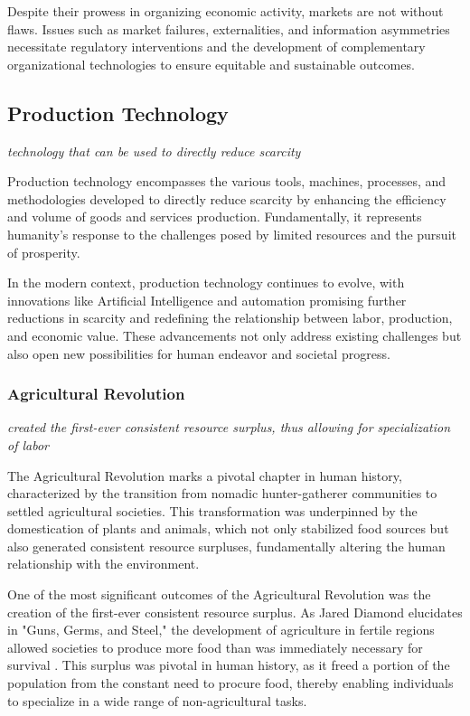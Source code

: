 \documentclass{article}
\begin{document}
Despite their prowess in organizing economic activity, markets are not without flaws. Issues such as market failures, externalities, and information asymmetries necessitate regulatory interventions and the development of complementary organizational technologies to ensure equitable and sustainable outcomes.

\subsection{Production Technology}
\label{sec:ProductionTechnology}
\textit{technology that can be used to directly reduce scarcity}

Production technology encompasses the various tools, machines, processes, and methodologies developed to directly reduce scarcity by enhancing the efficiency and volume of goods and services production. Fundamentally, it represents humanity's response to the challenges posed by limited resources and the pursuit of prosperity.

In the modern context, production technology continues to evolve, with innovations like Artificial Intelligence and automation promising further reductions in scarcity and redefining the relationship between labor, production, and economic value. These advancements not only address existing challenges but also open new possibilities for human endeavor and societal progress.


\subsubsection{Agricultural Revolution}
\label{sec:AgriculturalRevolution}

\textit{created the first-ever consistent resource surplus, thus allowing for specialization of labor}

The Agricultural Revolution marks a pivotal chapter in human history, characterized by the transition from nomadic hunter-gatherer communities to settled agricultural societies. This transformation was underpinned by the domestication of plants and animals, which not only stabilized food sources but also generated consistent resource surpluses, fundamentally altering the human relationship with the environment.

One of the most significant outcomes of the Agricultural Revolution was the creation of the first-ever consistent resource surplus. As Jared Diamond elucidates in "Guns, Germs, and Steel," the development of agriculture in fertile regions allowed societies to produce more food than was immediately necessary for survival \cite{Diamond1997Guns}. This surplus was pivotal in human history, as it freed a portion of the population from the constant need to procure food, thereby enabling individuals to specialize in a wide range of non-agricultural tasks.
\end{document}

